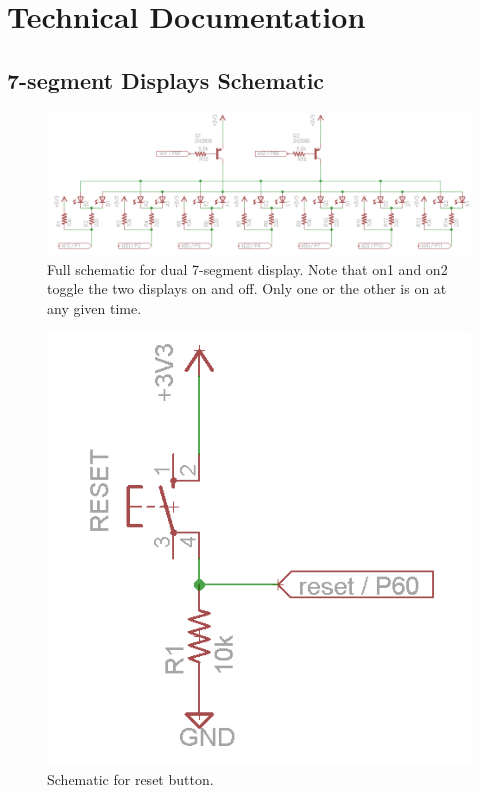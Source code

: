 \documentclass[11pt]{article}
\begin{document}
\clearpage

\section{Technical Documentation}


\subsection{7-segment Displays Schematic}

\begin{figure}[h!]
\centering
\includegraphics[scale=0.7, angle=90]{seven_segment_all.png}
\caption{Full schematic for dual 7-segment display. Note that on1 and on2 toggle the two displays on and off. Only one or the other is on at any given time.}
\label{fig:seven_seg_sch}
\end{figure} 


\begin{figure}[h!]
\centering
\includegraphics[scale=0.54]{reset.png}
\caption{Schematic for reset button.}
\label{fig:reset_sch}
\end{figure} 
\end{document}

